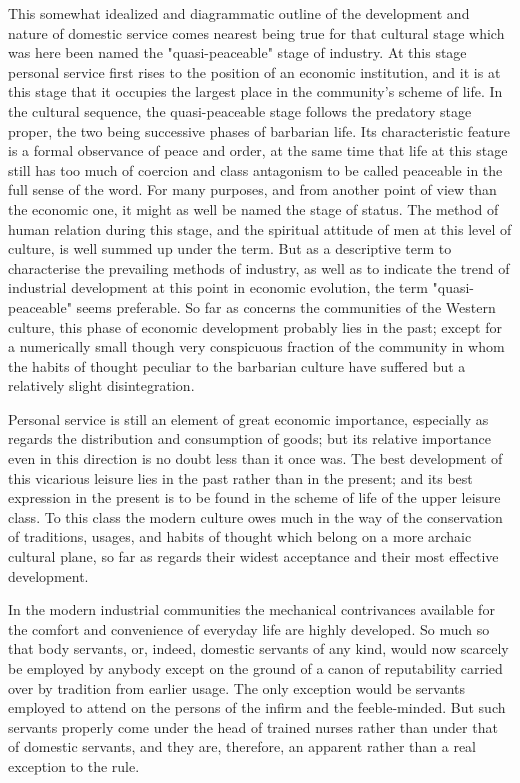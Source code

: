\documentclass[12pt]{report}
\begin{document}
This somewhat idealized and diagrammatic outline of the development and
nature of domestic service comes nearest being true for that cultural
stage which was here been named the "quasi-peaceable" stage of industry.
At this stage personal service first rises to the position of an
economic institution, and it is at this stage that it occupies the
largest place in the community's scheme of life. In the cultural
sequence, the quasi-peaceable stage follows the predatory stage proper,
the two being successive phases of barbarian life. Its characteristic
feature is a formal observance of peace and order, at the same time that
life at this stage still has too much of coercion and class antagonism
to be called peaceable in the full sense of the word. For many purposes,
and from another point of view than the economic one, it might as well
be named the stage of status. The method of human relation during this
stage, and the spiritual attitude of men at this level of culture, is
well summed up under the term. But as a descriptive term to characterise
the prevailing methods of industry, as well as to indicate the trend
of industrial development at this point in economic evolution, the term
"quasi-peaceable" seems preferable. So far as concerns the communities
of the Western culture, this phase of economic development probably
lies in the past; except for a numerically small though very conspicuous
fraction of the community in whom the habits of thought peculiar to the
barbarian culture have suffered but a relatively slight disintegration.

Personal service is still an element of great economic importance,
especially as regards the distribution and consumption of goods; but its
relative importance even in this direction is no doubt less than it once
was. The best development of this vicarious leisure lies in the past
rather than in the present; and its best expression in the present is to
be found in the scheme of life of the upper leisure class. To this
class the modern culture owes much in the way of the conservation of
traditions, usages, and habits of thought which belong on a more archaic
cultural plane, so far as regards their widest acceptance and their most
effective development.

In the modern industrial communities the mechanical contrivances
available for the comfort and convenience of everyday life are highly
developed. So much so that body servants, or, indeed, domestic servants
of any kind, would now scarcely be employed by anybody except on the
ground of a canon of reputability carried over by tradition from earlier
usage. The only exception would be servants employed to attend on the
persons of the infirm and the feeble-minded. But such servants properly
come under the head of trained nurses rather than under that of domestic
servants, and they are, therefore, an apparent rather than a real
exception to the rule.
\end{document}
